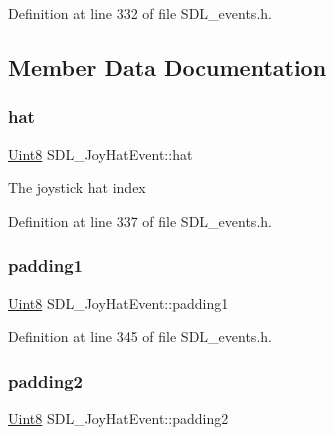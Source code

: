Definition at line 332 of file S\+D\+L\+\_\+events.\+h.



\subsection{Member Data Documentation}
\mbox{\label{struct_s_d_l___joy_hat_event_ab1b54a6d1091e583e856f86b5af1e2f6}} 
\subsubsection{\texorpdfstring{hat}{hat}}
{\footnotesize\ttfamily \mbox{\hyperlink{_s_d_l__stdinc_8h_a2944638813a090aa23e62f4da842c3e2}{Uint8}} S\+D\+L\+\_\+\+Joy\+Hat\+Event\+::hat}

The joystick hat index 

Definition at line 337 of file S\+D\+L\+\_\+events.\+h.

\mbox{\label{struct_s_d_l___joy_hat_event_afbe72b6702cf7f70ccbe206737ab2e49}} 
\subsubsection{\texorpdfstring{padding1}{padding1}}
{\footnotesize\ttfamily \mbox{\hyperlink{_s_d_l__stdinc_8h_a2944638813a090aa23e62f4da842c3e2}{Uint8}} S\+D\+L\+\_\+\+Joy\+Hat\+Event\+::padding1}



Definition at line 345 of file S\+D\+L\+\_\+events.\+h.

\mbox{\label{struct_s_d_l___joy_hat_event_adaca3e99773130ae456690ba83feb420}} 
\subsubsection{\texorpdfstring{padding2}{padding2}}
{\footnotesize\ttfamily \mbox{\hyperlink{_s_d_l__stdinc_8h_a2944638813a090aa23e62f4da842c3e2}{Uint8}} S\+D\+L\+\_\+\+Joy\+Hat\+Event\+::padding2}



